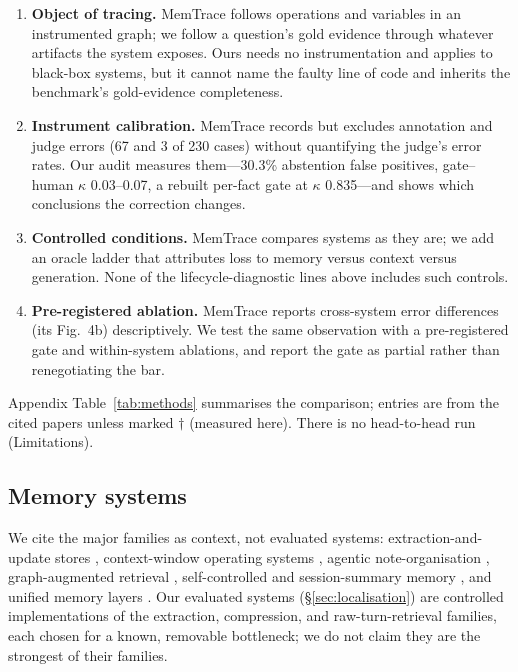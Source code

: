 \documentclass[11pt]{article}
\begin{document}
\begin{enumerate}
\item \textbf{Object of tracing.} MemTrace follows operations and variables in
an instrumented graph; we follow a question's gold evidence through whatever
artifacts the system exposes. Ours needs no instrumentation and applies to
black-box systems, but it cannot name the faulty line of code and inherits the
benchmark's gold-evidence completeness.
\item \textbf{Instrument calibration.} MemTrace records but excludes
annotation and judge errors (67 and 3 of 230 cases) without quantifying the
judge's error rates. Our audit measures them---30.3\% abstention false
positives, gate--human $\kappa$ 0.03--0.07, a rebuilt per-fact gate at
$\kappa$ 0.835---and shows which conclusions the correction changes.
\item \textbf{Controlled conditions.} MemTrace compares systems as they are; we
add an oracle ladder that attributes loss to memory versus context versus
generation. None of the lifecycle-diagnostic lines above includes such
controls.
\item \textbf{Pre-registered ablation.} MemTrace reports cross-system error
differences (its Fig.~4b) descriptively. We test the same observation with a
pre-registered gate and within-system ablations, and report the gate as
partial rather than renegotiating the bar.
\end{enumerate}

Appendix Table~\ref{tab:methods} summarises the comparison; entries are from
the cited papers unless marked $\dagger$ (measured here). There is no
head-to-head run (Limitations).


\subsection{Memory systems}

We cite the major families as context, not evaluated systems: extraction-and-update stores \citep{chhikara2025mem0},
context-window operating systems \citep{packer2023memgpt}, agentic
note-organisation \citep{xu2025amem}, graph-augmented retrieval
\citep{gutierrez2024hipporag}, self-controlled and session-summary memory
\citep{wang2024scm,pan2025secom}, and unified memory layers
\citep{li2025memos}. Our evaluated systems (\S\ref{sec:localisation}) are
controlled implementations of the extraction, compression, and
raw-turn-retrieval families, each chosen for a known, removable bottleneck;
we do not claim they are the strongest of their families.
\end{document}
